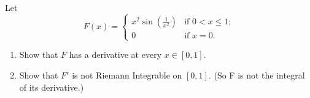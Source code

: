\documentclass[]{article}
\newcommand{\R}{\mathbb{R}}
\newcommand{\st}{\ : \ }
\newtheorem{definition}{Definition}
\begin{document}
\newpage
\section{}
Let\[
    F(x) = \begin{cases}
        x^2 \sin(\frac{1}{x^2}) & \text{if } 0 < x \leq 1;\\
        0 & \text{if } x = 0.
    \end{cases}
\]
\begin{enumerate}
    \item Show that $F$ has a derivative at every $x\in [0,1]$.
    \item Show that $F'$ is not Riemann Integrable on $[0,1]$. (So F is not the integral of its derivative.)
\end{enumerate}


\end{document}
